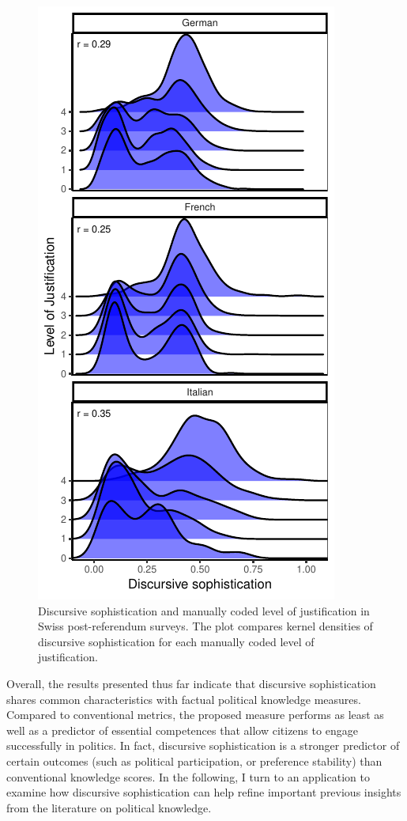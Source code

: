 \documentclass[12pt]{article}
\begin{document}
\begin{figure}[h]\centering
\includegraphics[scale=1]{../fig/swiss_ggridges.pdf}
\caption{Discursive sophistication and manually coded level of justification \citep{colombo2016justifications} in Swiss post-referendum surveys. The plot compares kernel densities of discursive sophistication for each manually coded level of justification.}\label{fig:swiss_ggridges}
\end{figure}

Overall, the results presented thus far indicate that discursive sophistication shares common characteristics with factual political knowledge measures. Compared to conventional metrics, the proposed measure performs as least as well as a predictor of essential competences that allow citizens to engage successfully in politics. In fact, discursive sophistication is a stronger predictor of certain outcomes (such as political participation, or preference stability) than conventional knowledge scores. In the following, I turn to an application to examine how discursive sophistication can help refine important previous insights from the literature on political knowledge.
\end{document}
